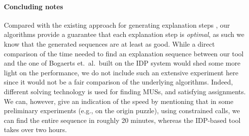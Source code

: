 \paragraph{Concluding notes}
Compared with the existing approach for generating explanation steps \cite{ecai/BogaertsGCG20}, our algorithms provide a guarantee that each explanation step is \emph{optimal}, as such we know that the generated sequences are at least as good. 
While a direct comparison of the time needed to find an explanation sequence between our tool and the one of Bogaerts et.\ al.\ built on the IDP system \cite{WarrenBook/DeCatBBD14} would shed some more light on the performance, we do not include such an extensive experiment here since it would not be a fair comparison of the underlying algorithms. Indeed, different solving technology is used for finding MUSs, and satisfying assignments. 
We can, however, give an indication of the speed by mentioning that in some preliminary experiments (e.g., on the origin puzzle), using constrained \omus calls, we can find the entire sequence in roughly 20 minutes, whereas the IDP-based tool takes over two hours.





%


